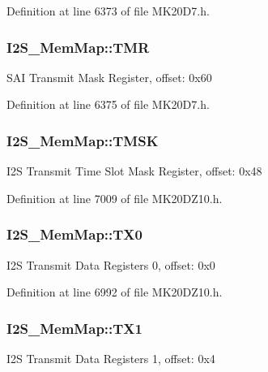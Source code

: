 Definition at line 6373 of file M\+K20\+D7.\+h.

\subsubsection[{\texorpdfstring{T\+MR}{TMR}}]{ I2\+S\+\_\+\+Mem\+Map\+::\+T\+MR}\hypertarget{struct_i2_s___mem_map_a52b2dd69044a5f8c990749c314664ae1}{}\label{struct_i2_s___mem_map_a52b2dd69044a5f8c990749c314664ae1}
S\+AI Transmit Mask Register, offset\+: 0x60 

Definition at line 6375 of file M\+K20\+D7.\+h.

\subsubsection[{\texorpdfstring{T\+M\+SK}{TMSK}}]{ I2\+S\+\_\+\+Mem\+Map\+::\+T\+M\+SK}\hypertarget{struct_i2_s___mem_map_a1c81ec607745d66dd95bf23d9b03d816}{}\label{struct_i2_s___mem_map_a1c81ec607745d66dd95bf23d9b03d816}
I2S Transmit Time Slot Mask Register, offset\+: 0x48 

Definition at line 7009 of file M\+K20\+D\+Z10.\+h.

\subsubsection[{\texorpdfstring{T\+X0}{TX0}}]{ I2\+S\+\_\+\+Mem\+Map\+::\+T\+X0}\hypertarget{struct_i2_s___mem_map_a9700d2c0e84dba16ddd6494fca29a68d}{}\label{struct_i2_s___mem_map_a9700d2c0e84dba16ddd6494fca29a68d}
I2S Transmit Data Registers 0, offset\+: 0x0 

Definition at line 6992 of file M\+K20\+D\+Z10.\+h.

\subsubsection[{\texorpdfstring{T\+X1}{TX1}}]{ I2\+S\+\_\+\+Mem\+Map\+::\+T\+X1}\hypertarget{struct_i2_s___mem_map_a9476d32b856cd1933128dc4206a751d1}{}\label{struct_i2_s___mem_map_a9476d32b856cd1933128dc4206a751d1}
I2S Transmit Data Registers 1, offset\+: 0x4 

